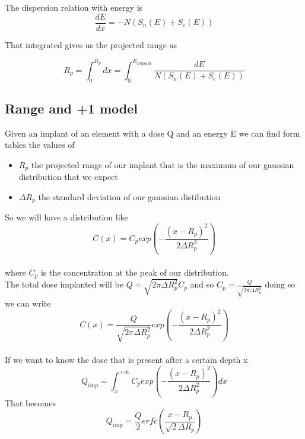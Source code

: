 The dispersion relation with energy is 
\begin{equation}
\frac{dE}{dx}=-N(S_n(E)+S_e(E))
\end{equation}

That integrated gives us the projected range as

\begin{equation}
R_p=\int_0^{R_p}dx=\int_0^{E_{implant}} \frac{dE}{N\left(S_n(E)+S_e(E)\right)}
\end{equation}

\subsection{Range and +1 model}

Given an implant of an element with a dose Q and an energy E we can find form tables the values of 
    \begin{itemize}
    \item $R_p$ the projected range of our implant that is the maximum of our gaussian distribution that we expect
    \item $\Delta R_p$ the standard deviation of our gaussian distibution
    \end{itemize}
So we will have a distribution like 
\begin{equation}
C(x)=C_p exp\left(-\frac{(x-R_p)^2}{2\Delta R_p^2}\right)
\end{equation}
\\
where $C_p$ is the concentration at the peak of our distribution.\\
The total dose implanted will be $Q=\sqrt{2\pi\Delta R_p^2} C_p$ and so $C_p=\frac{Q}{\sqrt{2\pi\Delta R_p^2}}$ doing so we can write
\begin{equation}
C(x)=\frac{Q}{\sqrt{2\pi\Delta R_p^2}}exp\left(-\frac{(x-R_p)^2}{2\Delta R_p^2}\right)
\end{equation}
\\

If we want to know the dose that is present after a certain depth x
\begin{equation}
Q_{imp}=\int_x^{+\infty}C_p exp\left(-\frac{(x-R_p)^2}{2\Delta R_p^2}\right) dx
\end{equation}
That becomes 
\begin{equation}
Q_{imp}=\frac{Q}{2}erfc\left(\frac{x-R_p}{\sqrt{2}\Delta R_p}\right)
\end{equation}
\\
\vspace{5mm}

